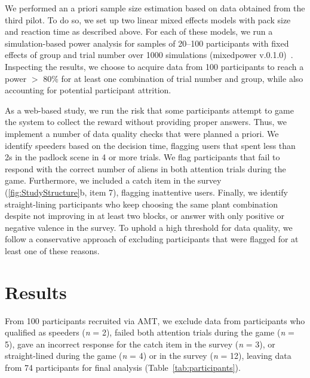We performed an a priori sample size estimation based on data obtained from the third pilot. 
To do so, we set up two linear mixed effects models with pack size and reaction time as described above. 
For each of these models, we run a simulation-based power analysis for samples of 20--100 participants with fixed effects of group and trial number over 1000 simulations (mixedpower v.0.1.0)~\citep{kumle_estimating_2021}. 
Inspecting the results, we choose to acquire data from 100 participants to reach a power $>$ 80\% for at least one combination of trial number and group, while also accounting for potential participant attrition.

As a web-based study, we run the risk that some participants attempt to game the system to collect the reward without providing proper answers. 
Thus, we implement a number of data quality checks that were planned a priori.
We identify speeders based on the decision time, flagging users that spent less than 2s in the padlock scene in 4 or more trials.
We flag participants that fail to respond with the correct number of aliens in both attention trials during the game.
Furthermore, we included a catch item in the survey (\ref{fig:StudyStructure}b, item 7), flagging inattentive users.
Finally, we identify straight-lining participants who keep choosing the same plant combination despite not improving in at least two blocks, or answer with only positive or negative valence in the survey.
To uphold a high threshold for data quality, we follow a conservative approach of excluding participants that were flagged for at least one of these reasons.

\section{Results}\label{sec:results}

From 100 participants recruited via \gls{AMT}, we exclude data from participants who qualified as speeders (\textit{n} = 2), failed both attention trials during the game (\textit{n} = 5), gave an incorrect response for the catch item in the survey (\textit{n} = 3), or straight-lined during the game (\textit{n} = 4) or in the survey (\textit{n} = 12), leaving data from 74 participants for final analysis (Table~\ref{tab:participants}).

